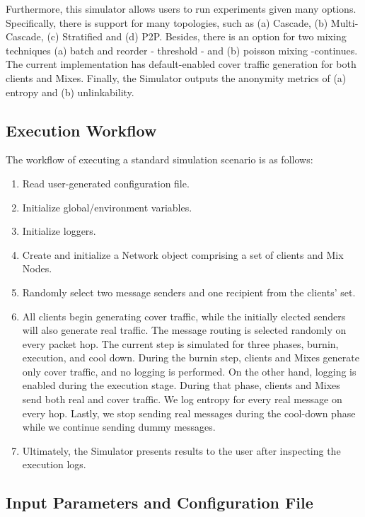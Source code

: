 \documentclass[logo,msc,cyber]{infthesis}   %
\begin{document}
Furthermore, this simulator allows users to run experiments given many options.
Specifically, there is support for many topologies, such as (a) Cascade, (b)
Multi-Cascade, (c) Stratified and (d) P2P. Besides, there is an option for two
mixing techniques (a) batch and reorder - threshold - and (b) poisson mixing
-continues. The current implementation has default-enabled cover traffic
generation for both clients and Mixes. Finally, the Simulator outputs the
anonymity metrics of (a) entropy and (b) unlinkability.

\subsection{Execution Workflow}

The workflow of executing a standard simulation scenario is as follows:

\begin{enumerate}
    \item Read user-generated configuration file.
    \item Initialize global/environment variables.
    \item Initialize loggers.
    \item Create and initialize a Network object comprising a set of clients and Mix Nodes.
    \item Randomly select two message senders and one recipient from the clients' set.
    \item All clients begin generating cover traffic, while the initially
    elected senders will also generate real traffic. The message routing is
    selected randomly on every packet hop. The current step is simulated for
    three phases, burnin, execution, and cool down. During the burnin step,
    clients and Mixes generate only cover traffic, and no logging is performed.
    On the other hand, logging is enabled during the execution stage. During
    that phase, clients and Mixes send both real and cover traffic. We log
    entropy for every real message on every hop. Lastly, we stop sending real
    messages during the cool-down phase while we continue sending dummy
    messages.
    \item Ultimately, the Simulator presents results to the user after
    inspecting the execution logs.
\end{enumerate}

\subsection{Input Parameters and Configuration File}
\end{document}

